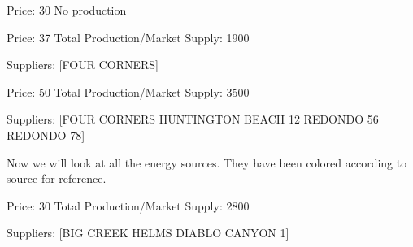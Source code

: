 \documentclass[letterpaper,10pt,english]{jupyterBook}
\begin{document}
\begin{sphinxVerbatim}[commandchars=\\\{\}]
Price: \PYGZdl{}30
No production
\end{sphinxVerbatim}

\noindent{}

\begin{sphinxVerbatim}[commandchars=\\\{\}]
Price: \PYGZdl{}37
Total Production/Market Supply:  1900

Suppliers:  [\PYGZsq{}FOUR CORNERS\PYGZsq{}]
\end{sphinxVerbatim}

\noindent{}

\begin{sphinxVerbatim}[commandchars=\\\{\}]
Price: \PYGZdl{}50
Total Production/Market Supply:  3500

Suppliers:  [\PYGZsq{}FOUR CORNERS\PYGZsq{} \PYGZsq{}HUNTINGTON BEACH 1\PYGZam{}2\PYGZsq{} \PYGZsq{}REDONDO 5\PYGZam{}6\PYGZsq{} \PYGZsq{}REDONDO 7\PYGZam{}8\PYGZsq{}]
\end{sphinxVerbatim}

\noindent{}

\sphinxAtStartPar
Now we will look at all the energy sources. They have been colored according to source for reference.

\begin{sphinxVerbatim}[commandchars=\\\{\}]
Price: \PYGZdl{}30
Total Production/Market Supply:  2800

Suppliers:  [\PYGZsq{}BIG CREEK\PYGZsq{} \PYGZsq{}HELMS\PYGZsq{} \PYGZsq{}DIABLO CANYON 1\PYGZsq{}]
\end{sphinxVerbatim}

\noindent{}

\noindent{}
\end{document}
